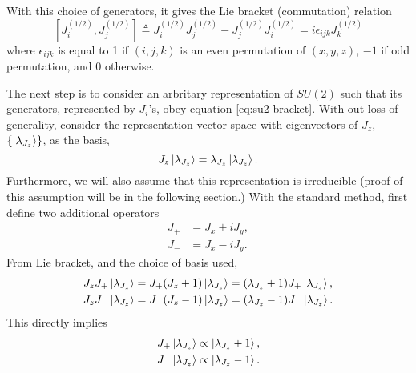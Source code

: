 \documentclass[preprint, 12pt]{revtex4-2}
\numberwithin{equation}{section}
\begin{document}
With this choice of generators, it gives the Lie bracket (commutation) relation
\begin{equation} \label{eq:su2 bracket}
    \left[J^{(1/2)}_i, J^{(1/2)}_j\right] \triangleq J^{(1/2)}_iJ^{(1/2)}_j-J^{(1/2)}_jJ^{(1/2)}_i = i\epsilon_{ijk}J^{(1/2)}_k
\end{equation}
where $\epsilon_{ijk}$ is equal to 1 if $(i, j, k)$ is an even permutation of $(x, y, z)$, $-1$ if odd permutation, and 0 otherwise.

The next step is to consider an arbritary representation of $SU(2)$ such that its generators, represented by $J_i$'s, obey equation \ref{eq:su2 bracket}. With out loss of generality, consider the representation vector space with eigenvectors of $J_z$, $\{\ket{\lambda_{J_z}}\}$, as the basis,
\begin{equation}\label{eq:Jz eigenvalue equation}
    J_z\ket{\lambda_{J_z}}=\lambda_{J_z}\ket{\lambda_{J_z}}.
\end{equation}
Furthermore, we will also assume that this representation is irreducible (proof of this assumption will be in the following section.) With the standard method, first define two additional operators
\begin{equation}\label{eq:ladder operators}
    \begin{aligned}
        J_+ &= J_x + iJ_y, \\
        J_- &= J_x - iJ_y.
    \end{aligned}
\end{equation}
From Lie bracket, and the choice of basis used,
\begin{equation}\label{eq:ladder equation}
    \begin{aligned}
        J_zJ_+\ket{\lambda_{J_z}} &= J_+(J_z+1)\ket{\lambda_{J_z}} = (\lambda_{J_z}+1)J_+\ket{\lambda_{J_z}}, \\
        J_zJ_-\ket{\lambda_{J_z}} &= J_-(J_z-1)\ket{\lambda_{J_z}} = (\lambda_{J_z}-1)J_-\ket{\lambda_{J_z}}.
    \end{aligned}
\end{equation}
This directly implies
\begin{equation}\label{eq:ladder_propto}
    \begin{aligned}
        J_+\ket{\lambda_{J_z}} &\propto \ket{\lambda_{J_z}+1}, \\
        J_-\ket{\lambda_{J_z}} &\propto \ket{\lambda_{J_z}-1}.
    \end{aligned}
\end{equation}
\end{document}
